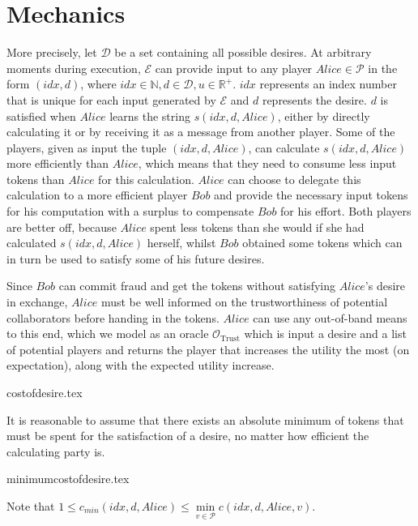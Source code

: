 \section{Mechanics}
  More precisely, let $\mathcal{D}$ be a set containing all possible desires. At arbitrary
  moments during execution, $\mathcal{E}$ can provide input to any player $Alice \in
  \mathcal{P}$ in the form $\left(idx, d\right)$, where $idx \in \mathbb{N}, d \in
  \mathcal{D}, u \in \mathbb{R}^{+}$. $idx$ represents an index number that is unique for
  each input generated by $\mathcal{E}$ and $d$ represents the desire. $d$ is satisfied
  when $Alice$ learns the string $s\left(idx, d, Alice\right)$, either by directly
  calculating it or by receiving it as a message from another player. Some of the players,
  given as input the tuple $\left(idx, d, Alice\right)$, can calculate $s\left(idx, d,
  Alice\right)$ more efficiently than $Alice$, which means that they need to consume less
  input tokens than $Alice$ for this calculation. $Alice$ can choose to delegate this
  calculation to a more efficient player $Bob$ and provide the necessary input tokens for
  his computation with a surplus to compensate $Bob$ for his effort. Both players are
  better off, because $Alice$ spent less tokens than she would if she had calculated
  $s\left(idx, d, Alice\right)$ herself, whilst $Bob$ obtained some tokens which can in
  turn be used to satisfy some of his future desires.

  Since $Bob$ can commit fraud and get the tokens without satisfying $Alice$'s desire in
  exchange, $Alice$ must be well informed on the trustworthiness of potential
  collaborators before handing in the tokens. $Alice$ can use any out-of-band means to
  this end, which we model as an oracle $\mathcal{O}_{\mathrm{Trust}}$ which is input a
  desire and a list of potential players and returns the player that increases the utility
  the most (on expectation), along with the expected utility increase.

  {costofdesire.tex}

  It is reasonable to assume that there exists an absolute minimum of tokens that must be
  spent for the satisfaction of a desire, no matter how efficient the calculating party
  is.

  {minimumcostofdesire.tex}

  \noindent Note that $1 \leq c_{min}\left(idx, d, Alice\right) \leq \min\limits_{v \in
  \mathcal{P}}{c\left(idx, d, Alice, v\right)}$.

